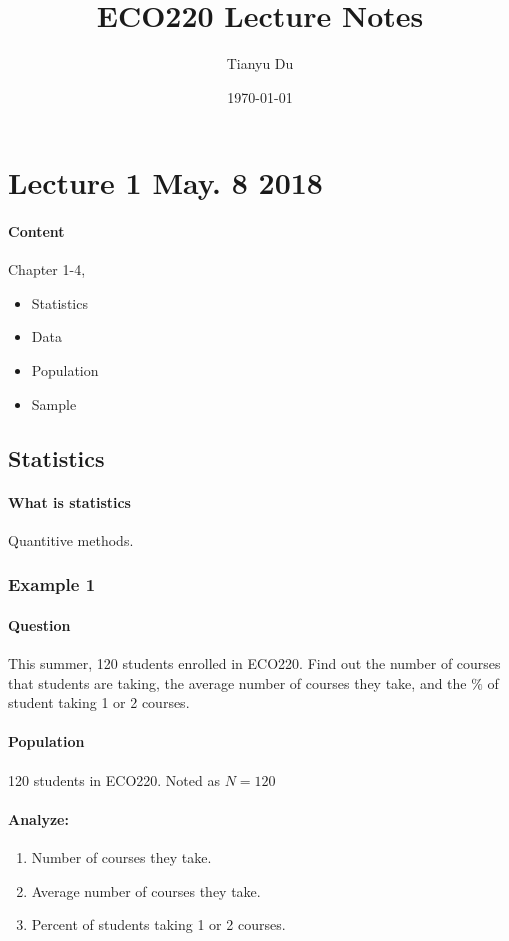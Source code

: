 \documentclass[11pt]{article}
\title{ECO220 Lecture Notes}
\author{Tianyu Du}
\date{\today}
\begin{document}
\maketitle
\doclicenseThis
\tableofcontents

\section{Lecture 1 May. 8 2018}
\paragraph{Content} Chapter 1-4,
\begin{itemize}
	\item Statistics
	\item Data
	\item Population
	\item Sample
\end{itemize}

\subsection{Statistics}
\paragraph{What is statistics} Quantitive methods.
\subsubsection{Example 1}
	\paragraph{Question} This summer, 120 students enrolled in ECO220. Find out the number of courses that students are taking, the average number of courses they take, and the $\%$ of student taking 1 or 2 courses.

	\paragraph{Population} 120 students in ECO220. Noted as $N = 120$
	
	\paragraph{Analyze:}
	\begin{enumerate}
		\item Number of courses they take.
		\item Average number of courses they take.
		\item Percent of students taking 1 or 2 courses.
	\end{enumerate}
	
\end{document}
